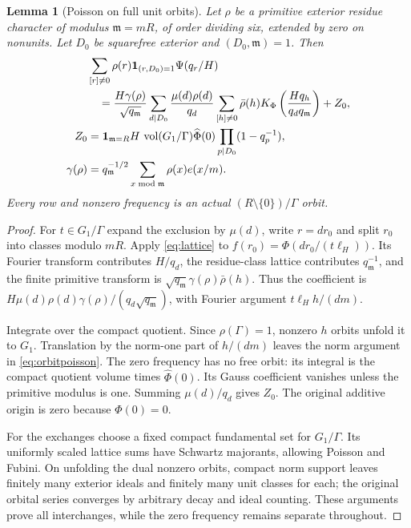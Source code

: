 \documentclass[11pt,a4paper]{article}
\numberwithin{equation}{section}
\newtheorem{lemma}[theorem]{Lemma}
\theoremstyle{definition}
\theoremstyle{remark}
\newcommand{\ind}{\mathbf1}
\newcommand{\vol}{\operatorname{vol}}
\newcommand{\wt}{\widehat}
\begin{document}
\begin{lemma}[Poisson on full unit orbits]\label{lem:orbitpoisson}
Let $\rho$ be a primitive exterior residue character of modulus $\mathfrak m=mR$, of order dividing six, extended by zero on nonunits. Let $D_0$ be squarefree exterior and $(D_0,\mathfrak m)=1$. Then
\begin{align}\label{eq:orbitpoisson}
 &\sum_{[r]\ne0}\rho(r)\ind_{(r,D_0)=1}\Psi(q_r/H)\notag\\
 &\quad=\frac{H\gamma(\rho)}{\sqrt{q_{\mathfrak m}}}
 \sum_{d\mid D_0}\frac{\mu(d)\rho(d)}{q_d}
 \sum_{[h]\ne0}\bar\rho(h)
 K_\Phi\left(\frac{Hq_h}{q_dq_{\mathfrak m}}\right)+Z_0,\\
 Z_0&=\ind_{\mathfrak m=R}H\,\vol(G_1/\Gamma)\wt\Phi(0)
                          \prod_{p\mid D_0}(1-q_p^{-1}),\notag\\
 \gamma(\rho)&=q_{\mathfrak m}^{-1/2}
                    \sum_{x\bmod\mathfrak m}\rho(x)e(x/m).\notag
\end{align}
Every row and nonzero frequency is an actual $(R\setminus\{0\})/\Gamma$ orbit.
\end{lemma}
\begin{proof}
For $t\in G_1/\Gamma$ expand the exclusion by $\mu(d)$, write $r=dr_0$ and split $r_0$ into classes modulo $mR$. Apply \eqref{eq:lattice} to
$f(r_0)=\Phi(dr_0/(t\ell_H))$. Its Fourier transform contributes $H/q_d$, the residue-class lattice contributes $q_{\mathfrak m}^{-1}$, and the finite primitive transform is
$\sqrt{q_{\mathfrak m}}\gamma(\rho)\bar\rho(h)$. Thus the coefficient is $H\mu(d)\rho(d)\gamma(\rho)/(q_d\sqrt{q_{\mathfrak m}})$, with Fourier argument $t\ell_Hh/(dm)$.

Integrate over the compact quotient. Since $\rho(\Gamma)=1$, nonzero $h$ orbits unfold it to $G_1$. Translation by the norm-one part of $h/(dm)$ leaves the norm argument in \eqref{eq:orbitpoisson}. The zero frequency has no free orbit: its integral is the compact quotient volume times $\wt\Phi(0)$. Its Gauss coefficient vanishes unless the primitive modulus is one. Summing $\mu(d)/q_d$ gives $Z_0$. The original additive origin is zero because $\Phi(0)=0$.

For the exchanges choose a fixed compact fundamental set for $G_1/\Gamma$. Its uniformly scaled lattice sums have Schwartz majorants, allowing Poisson and Fubini. On unfolding the dual nonzero orbits, compact norm support leaves finitely many exterior ideals and finitely many unit classes for each; the original orbital series converges by arbitrary decay and ideal counting. These arguments prove all interchanges, while the zero frequency remains separate throughout.
\end{proof}
\end{document}
